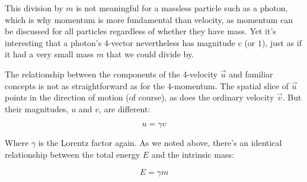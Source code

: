 This division by $m$ is not meaningful for a massless particle such as a photon, which is why momentum is more fundamental than velocity, as momentum can be discussed for all particles regardless of whether they have mass. Yet it's interesting that a photon's 4-vector nevertheless has magnitude $c$ (or $1$), just as if it had a very small mass $m$ that we could divide by.

The relationship between the components of the 4-velocity $\vec{u}$ and familiar concepts is not as straightforward as for the 4-momentum. The spatial slice of $\vec{u}$ points in the direction of motion (of course), as does the ordinary velocity $\vec{v}$. But their magnitudes, $u$ and $v$, are different:

$$u = \gamma v$$

Where $\gamma$ is the Lorentz factor again. As we noted above, there's an identical relationship between the total energy $E$ and the intrinsic mass:

$$E = \gamma m$$
